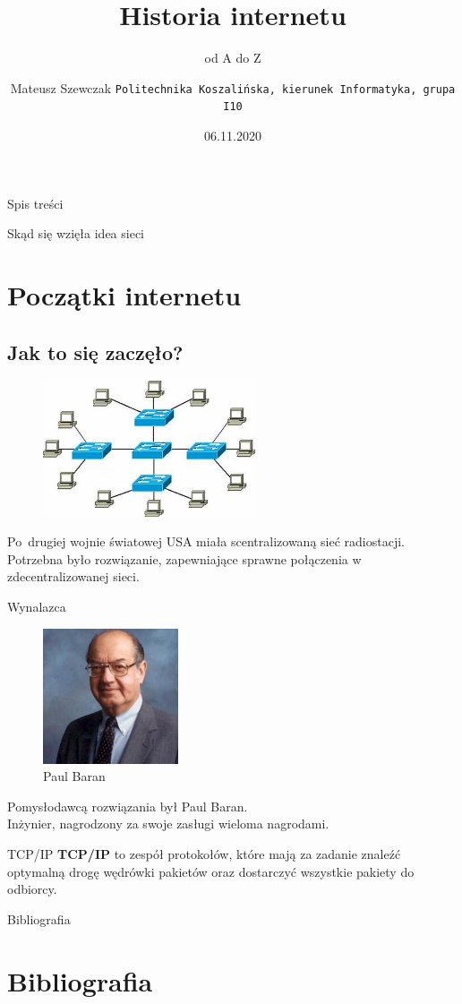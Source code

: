 \documentclass{beamer}
\title{Historia internetu}
\subtitle{od A do Z}
\author[Mateusz Szewczak]{Mateusz Szewczak
	\texttt{Politechnika Koszalińska, kierunek Informatyka, grupa I10}}
\date[Koszalin 2020]{06.11.2020}
\begin{document}
	
	\begin{frame}
		\maketitle
	\end{frame}
	\begin{frame}{Spis treści}
		\tableofcontents
	\end{frame}
	\begin{frame}{Skąd się wzięła idea sieci}
		\section{Początki internetu}
		\subsection{Jak to się zaczęło?}
		\begin{figure}
			\flushright
			\vspace{-30pt}
			\includegraphics[height=4cm]{gwiazda.jpg}
			\caption{\cite{SOISK.PL}}
		\end{figure}
		Po~drugiej wojnie światowej USA miała scentralizowaną sieć radiostacji. Potrzebna było rozwiązanie, zapewniające sprawne połączenia w zdecentralizowanej sieci.
		\nocite{hist:int:wiki}
	\end{frame}
	\begin{frame}{Wynalazca}
		\begin{figure}
			\flushright
			\vspace{-30pt}
			\includegraphics[height=4cm]{baran-zdjecie.jpg}
			\caption{Paul Baran}
		\end{figure}
		Pomysłodawcą rozwiązania był Paul Baran. \\
		Inżynier, nagrodzony za swoje zasługi wieloma nagrodami.
	\end{frame}
	\begin{frame}{TCP/IP}
		\textbf{TCP/IP} to zespół protokołów, które mają za zadanie znaleźć optymalną drogę wędrówki pakietów oraz dostarczyć wszystkie pakiety do odbiorcy.
	\end{frame}

	\begin{frame}{Bibliografia}
	\section{Bibliografia}
	
	\end{frame}
\end{document}
